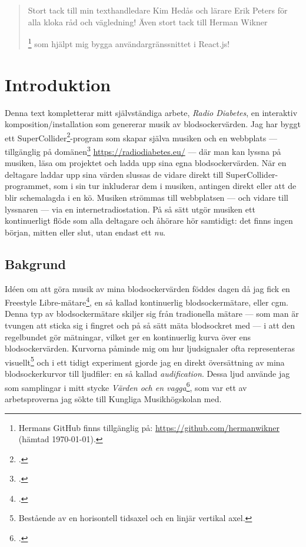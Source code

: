 \documentclass[11pt, a4paper]{article} %
\newcommand{\symfootnote}[1]{%
\let\oldthefootnote=\thefootnote%
\stepcounter{mpfootnote}%
\addtocounter{footnote}{-1}%
\renewcommand{\thefootnote}{$\star$}%
\footnote{#1}%
\let\thefootnote=\oldthefootnote%
}
\begin{document}
\clearpage


\newpage

\renewcommand{\abstractname}{Tack}
\begin{abstract}
  \noindent
Stort tack till min texthandledare Kim Hedås och lärare Erik Peters för alla kloka råd och vägledning! Även stort tack till Herman Wikner\symfootnote{Hermans GitHub finns tillgänglig på: \url{https://github.com/hermanwikner} (hämtad \today).} som hjälpt mig bygga användargränssnittet i React.js! 
\end{abstract}
\thispagestyle{empty}
\clearpage


\begin{singlespace}
  \tableofcontents
\end{singlespace}

\clearpage

\section*{Introduktion}
Denna text kompletterar mitt självständiga arbete, \emph{Radio Diabetes}, en interaktiv komposition/installation som genererar musik av blodsockervärden. Jag har byggt ett SuperCollider\footcite{noauthor_supercollider_nodate}-program som skapar själva musiken och en webbplats --- tillgänglig på domänen\footcite{jondell_radio_nodate} \url{https://radiodiabetes.eu/} --- där man kan lyssna på musiken, läsa om projektet och ladda upp sina egna blodsockervärden. När en deltagare laddar upp sina värden slussas de vidare direkt till SuperCollider-programmet, som i sin tur inkluderar dem i musiken, antingen direkt eller att de blir schemalagda i en kö. Musiken strömmas till webbplatsen --- och vidare till lyssnaren --- via en internetradiostation. På så sätt utgör musiken ett kontinuerligt flöde som alla deltagare och åhörare hör samtidigt: det finns ingen början, mitten eller slut, utan endast ett \emph{nu}. 

\subsection*{Bakgrund}
Idéen om att göra musik av mina blodsockervärden föddes dagen då jag fick en Freestyle Libre-mätare\footcite{noauthor_freestyle_nodate}, en så kallad kontinuerlig blodsockermätare, eller \gls{cgm}. Denna typ av blodsockermätare skiljer sig från tradionella mätare --- som man är tvungen att sticka sig i fingret och på så sätt mäta blodsockret med --- i att den regelbundet gör mätningar, vilket ger en kontinuerlig kurva över ens blodsockervärden.  Kurvorna påminde mig om hur ljudsignaler ofta representeras visuellt\footnote{Bestående av en horisontell tidsaxel och en linjär vertikal axel.} och i ett tidigt experiment gjorde jag en direkt översättning av mina blodsockerkurvor till ljudfiler: en så kallad \emph{\gls{audification}}. Dessa ljud använde jag som samplingar i mitt stycke \emph{Värden och en vagga}\footcite{jondell_varden_2017}, som var ett av arbetsproverna jag sökte till Kungliga Musikhögskolan med. 
\end{document}
